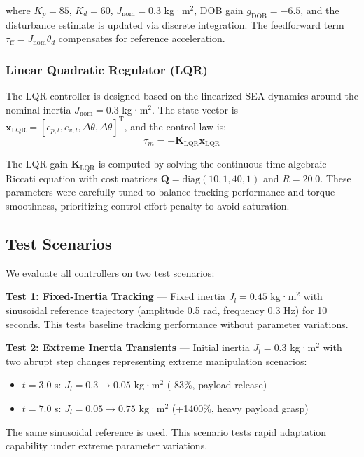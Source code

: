 \documentclass[lettersize,journal]{IEEEtran}
\begin{document}
\noindent where $K_p = 85$, $K_d = 60$, $J_{\text{nom}} = 0.3$ kg·m$^2$, DOB gain $g_{\text{DOB}} = -6.5$, and the disturbance estimate is updated via discrete integration. The feedforward term $\tau_{\text{ff}} = J_{\text{nom}} \ddot{\theta}_d$ compensates for reference acceleration.

\subsubsection{Linear Quadratic Regulator (LQR)}

The LQR controller is designed based on the linearized SEA dynamics around the nominal inertia $J_{\text{nom}} = 0.3$ kg·m$^2$. The state vector is $\bm{x}_{\text{LQR}} = [e_{p,l}, e_{v,l}, \Delta\theta, \dot{\Delta\theta}]^\mathrm{T}$, and the control law is:
\begin{equation}
\tau_m = -\bm{K}_{\text{LQR}} \bm{x}_{\text{LQR}} \label{eq:lqr_control}
\end{equation}

The LQR gain $\bm{K}_{\text{LQR}}$ is computed by solving the continuous-time algebraic Riccati equation with cost matrices $\bm{Q} = \text{diag}(10, 1, 40, 1)$ and $R = 20.0$. These parameters were carefully tuned to balance tracking performance and torque smoothness, prioritizing control effort penalty to avoid saturation.

\subsection{Test Scenarios}

We evaluate all controllers on two test scenarios:

\textbf{Test 1: Fixed-Inertia Tracking} — Fixed inertia $J_l = 0.45$ kg·m$^2$ with sinusoidal reference trajectory (amplitude 0.5 rad, frequency 0.3 Hz) for 10 seconds. This tests baseline tracking performance without parameter variations.

\textbf{Test 2: Extreme Inertia Transients} — Initial inertia $J_l = 0.3$ kg·m$^2$ with two abrupt step changes representing extreme manipulation scenarios:
\begin{itemize}
\item $t = 3.0$ s: $J_l = 0.3 \rightarrow 0.05$ kg·m$^2$ (-83\%, payload release)
\item $t = 7.0$ s: $J_l = 0.05 \rightarrow 0.75$ kg·m$^2$ (+1400\%, heavy payload grasp)
\end{itemize}

The same sinusoidal reference is used. This scenario tests rapid adaptation capability under extreme parameter variations.
\end{document}
